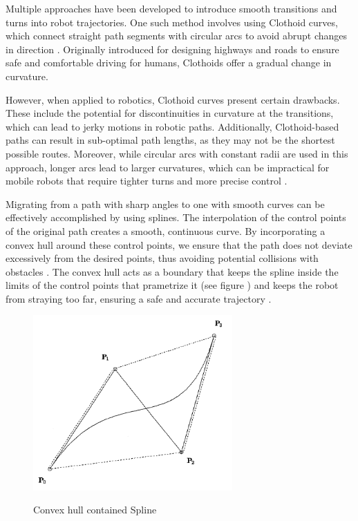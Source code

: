 Multiple approaches have been developed to introduce smooth transitions and turns into robot trajectories. 
One such method involves using Clothoid curves, which connect straight path segments with circular arcs 
to avoid abrupt changes in direction \cite{R31}. Originally introduced for designing highways and roads to 
ensure safe and comfortable driving for humans, Clothoids offer a gradual change in curvature.

However, when applied to robotics, Clothoid curves present certain drawbacks. These include the potential 
for discontinuities in curvature at the transitions, which can lead to jerky motions in robotic paths. 
Additionally, Clothoid-based paths can result in sub-optimal path lengths, as they may not be the shortest 
possible routes. Moreover, while circular arcs with constant radii are used in this approach, longer 
arcs lead to larger curvatures, which can be impractical for mobile robots that require tighter turns 
and more precise control \cite{R31}.

Migrating from a path with sharp angles to one with smooth curves can be effectively accomplished by 
using splines. The interpolation of the control points of the original path 
creates a smooth, continuous curve. By incorporating a convex hull around these control points, we 
ensure that the path does not deviate excessively from the desired points, thus avoiding potential 
collisions with obstacles \cite{R33}. The convex hull acts as a boundary that keeps the spline inside the limits of 
the control points that prametrize it (see figure ) and keeps the robot from straying 
too far, ensuring a safe and accurate trajectory \cite{R29}.

\begin{figure}[H]
    \begin{center}
        \includegraphics[width=3in]{images/Chap1/convex-hull.png}\\
        \caption{Convex hull contained Spline \cite{R29}}
        \label{convex-hull}
    \end{center}
\end{figure}

